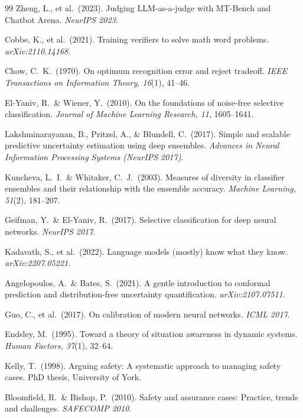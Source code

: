 \documentclass[10pt,twocolumn]{article}
\begin{document}
\begin{thebibliography}{99}
Zheng, L., et al.\ (2023).
Judging LLM-as-a-judge with MT-Bench and Chatbot Arena.
\emph{NeurIPS 2023}.

Cobbe, K., et al.\ (2021).
Training verifiers to solve math word problems.
\emph{arXiv:2110.14168}.

Chow, C.\ K.\ (1970).
On optimum recognition error and reject tradeoff.
\emph{IEEE Transactions on Information Theory, 16}(1), 41--46.

El-Yaniv, R.\ \& Wiener, Y.\ (2010).
On the foundations of noise-free selective classification.
\emph{Journal of Machine Learning Research, 11}, 1605--1641.

Lakshminarayanan, B., Pritzel, A., \& Blundell, C.\ (2017).
Simple and scalable predictive uncertainty estimation using deep ensembles.
\emph{Advances in Neural Information Processing Systems (NeurIPS 2017)}.

Kuncheva, L.\ I.\ \& Whitaker, C.\ J.\ (2003).
Measures of diversity in classifier ensembles and their relationship with
the ensemble accuracy.
\emph{Machine Learning, 51}(2), 181--207.

Geifman, Y.\ \& El-Yaniv, R.\ (2017).
Selective classification for deep neural networks.
\emph{NeurIPS 2017}.

Kadavath, S., et al.\ (2022).
Language models (mostly) know what they know.
\emph{arXiv:2207.05221}.

Angelopoulos, A.\ \& Bates, S.\ (2021).
A gentle introduction to conformal prediction and distribution-free uncertainty quantification.
\emph{arXiv:2107.07511}.

Guo, C., et al.\ (2017).
On calibration of modern neural networks.
\emph{ICML 2017}.

Endsley, M.\ (1995).
Toward a theory of situation awareness in dynamic systems.
\emph{Human Factors, 37}(1), 32--64.

Kelly, T.\ (1998).
Arguing safety: A systematic approach to managing safety cases.
PhD thesis, University of York.

Bloomfield, R.\ \& Bishop, P.\ (2010).
Safety and assurance cases: Practice, trends and challenges.
\emph{SAFECOMP 2010}.


\end{thebibliography}
\end{document}
